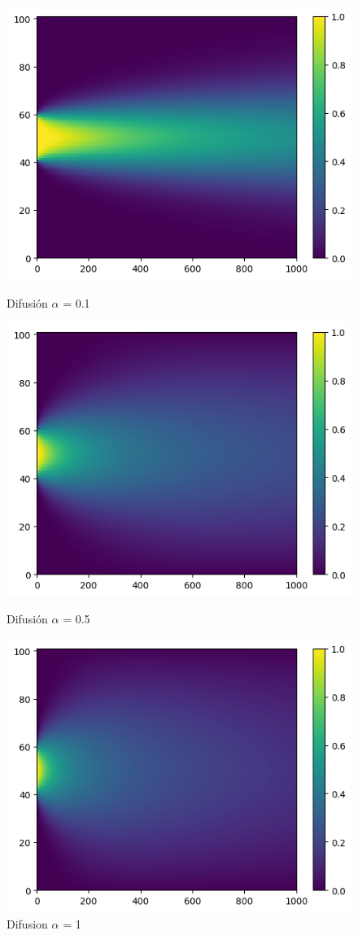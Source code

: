 \begin{figure}[H] 
  \label{ fig7} 
  \begin{minipage}[b]{0.5\linewidth}
    \centering
    \includegraphics[width=.5\linewidth]{./img/alfa1.png}
  \caption{Difusión $\alpha$ = 0.1}\label{fig:awesome_image1} 
    \vspace{4ex}
  \end{minipage}%
  \begin{minipage}[b]{0.5\linewidth}
      \centering
    \includegraphics[width=.5\linewidth]{./img/alfa05.png} 
    \caption{Difusión $\alpha$ = 0.5} \label{dif0.5} 
    \vspace{4ex}
  \end{minipage} 
  \begin{minipage}[b]{0.5\linewidth}
    \centering
    \includegraphics[width=.5\linewidth]{./img/result_dif.png}
  \caption{Difusion $\alpha$ = 1}\label{fig:alpha_1}
    \vspace{4ex}
  \end{minipage}%

\end{figure}

